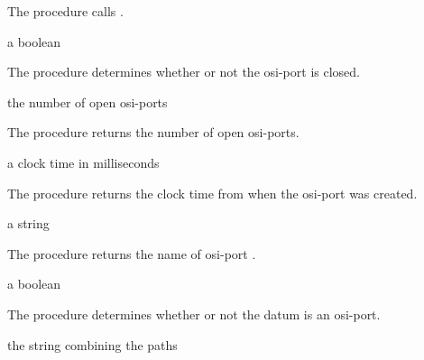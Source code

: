 The  procedure calls
.

\begin{procedure}
\end{procedure}
\returns{} a boolean

The  procedure determines whether or not the
osi-port  is closed.

\begin{procedure}
\end{procedure}
\returns{} the number of open osi-ports

The  procedure returns the number of open
osi-ports.

\begin{procedure}
\end{procedure}
\returns{} a clock time in milliseconds

The  procedure returns the clock time from
 when the osi-port  was created.

\begin{procedure}
\end{procedure}
\returns{} a string

The  procedure returns the name of osi-port
.

\begin{procedure}
\end{procedure}
\returns{} a boolean

The  procedure determines whether or not the datum
 is an osi-port.

\begin{procedure}
\end{procedure}
\returns{} the string combining the paths

